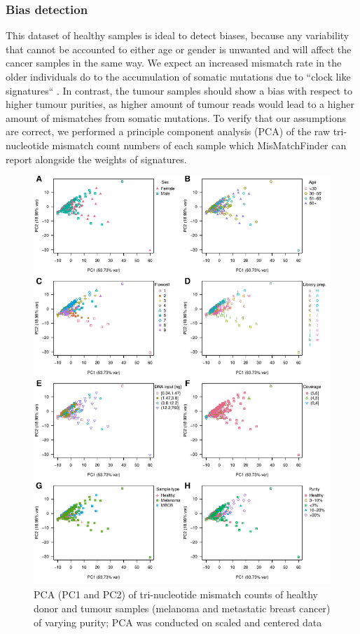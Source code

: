 \subsubsection{Bias detection}
\label{mmf-sec:healthyBias}
This dataset of healthy samples is ideal to detect biases, because any variability that cannot be accounted to either age or gender is unwanted and will affect the cancer samples in the same way. We expect an increased mismatch rate in the older individuals do to the accumulation of somatic mutations due to ``clock like signatures`` \cite{Abascal2021}. In contrast, the tumour samples should show a bias with respect to higher tumour purities, as higher amount of tumour reads would lead to a higher amount of mismatches from somatic mutations.
To verify that our assumptions are correct, we performed a principle component analysis (PCA) of the raw tri-nucleotide mismatch count numbers of each sample which MisMatchFinder can report alongside the weights of signatures.

\begin{figure}[!ht]
\centering
\includegraphics[width=.99\linewidth]{Figures/MisMatchFinder/countPCAsPC1vsPC2.pdf}
\caption[PCA of tri-nucleotide mismatch counts of real world data (PC1 and PC2)]{PCA (PC1 and PC2) of tri-nucleotide mismatch counts of healthy donor and tumour samples (melanoma and metastatic breast cancer) of varying purity; PCA was conducted on scaled and centered data}\label{fig:mmf-pca1v2}
\end{figure}

